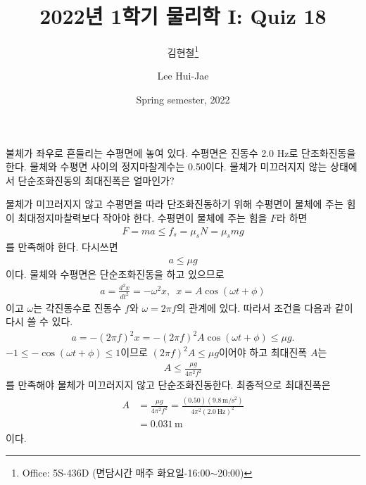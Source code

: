 \documentclass[floatfix,nofootinbib,superscriptaddress,fleqn]{revtex4-2}
\begin{document}
\title{\Large 2022년 1학기 물리학 I: Quiz 18}
\author{김현철\footnote{Office: 5S-436D (면담시간 매주
    화요일-16:00$\sim$20:00)}} 
\author{Lee Hui-Jae} 
\date{Spring semester, 2022}


\vspace{1.cm}

\maketitle

 
불체가 좌우로 흔들리는 수평면에 놓여 있다. 수평면은 진동수 2.0 Hz로
단조화진동을 한다. 물체와 수평면 사이의 정지마찰계수는
0.50이다. 물체가 미끄러지지 않는 상태에서 단순조화진동의 최대진폭은
얼마인가? 
  
물체가 미끄러지지 않고 수평면을 따라 단조화진동하기 위해 수평면이 물체에 주는 힘이
최대정지마찰력보다 작아야 한다. 수평면이 물체에 주는 힘을 $F$라 하면
\begin{align}
  F = ma  \leq f_s = \mu_s N = \mu_s mg
\end{align}
를 만족해야 한다. 다시쓰면
\begin{align}
  a  \leq \mu g
\end{align}
이다. 물체와 수평면은 단순조화진동을 하고 있으므로
 \begin{align}
   a = \frac{d^2x}{dt^2} = -\omega^2x,\,\,\,
   x = A\cos(\omega t+\phi)
 \end{align}
 이고 $\omega$는 각진동수로 진동수 $f$와 $\omega = 2\pi f$의 관계에 있다.
 따라서 조건을 다음과 같이 다시 쓸 수 있다.
 \begin{align}
   a = -(2\pi f)^2x = -(2\pi f)^2A\cos(\omega t+\phi)  \leq \mu g.
 \end{align}
 $-1\leq-\cos(\omega t+\phi)\leq 1$이므로 $(2\pi f)^2A \leq\mu g$이어야 하고
 최대진폭 $A$는
 \begin{align}
   A \leq \frac{\mu g}{4\pi^2f^2}
 \end{align}
 를 만족해야 물체가 미끄러지지 않고 단순조화진동한다. 최종적으로 최대진폭은
 \begin{align}
  \begin{split}
    A &= \frac{\mu g}{4\pi^2f^2} 
    = \frac{(0.50)(9.8\,\mathrm{m/s^2})}{4\pi^2(2.0\,\mathrm{Hz})^2}  \\
    &=0.031\,\mathrm{m}
  \end{split}
 \end{align}
 이다.
\newpage
 
\end{document}
